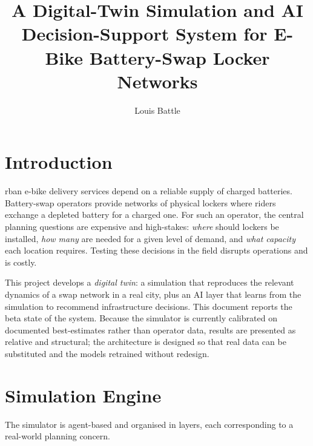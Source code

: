 \documentclass[9pt,a4paper,twocolumn,twoside]{rho-class/rho}
\title{A Digital-Twin Simulation and AI Decision-Support System for E-Bike Battery-Swap Locker Networks}
\author[{\textasteriskcentered},a,1]{Louis Battle}
\affil[a]{E-Bike Battery-Swap Network Simulation Project}
\begin{document}
    \maketitle
    \thispagestyle{firststyle}
    \tableofcontents


\section{Introduction}

    rban e-bike delivery services depend on a reliable supply of
    charged batteries. Battery-swap operators provide networks of physical
    lockers where riders exchange a depleted battery for a charged one. For
    such an operator, the central planning questions are expensive and
    high-stakes: \emph{where} should lockers be installed, \emph{how many} are
    needed for a given level of demand, and \emph{what capacity} each location
    requires. Testing these decisions in the field disrupts operations and is
    costly.

    This project develops a \emph{digital twin}: a simulation that reproduces
    the relevant dynamics of a swap network in a real city, plus an
    AI layer that learns from the simulation to recommend infrastructure
    decisions. This document reports the beta state of the system. Because the
    simulator is currently calibrated on documented best-estimates rather than
    operator data, results are presented as relative and structural; the
    architecture is designed so that real data can be substituted and the
    models retrained without redesign.

\section{Simulation Engine}

    The simulator is agent-based \cite{mesa2020} and organised in layers, each
    corresponding to a real-world planning concern.
\end{document}
